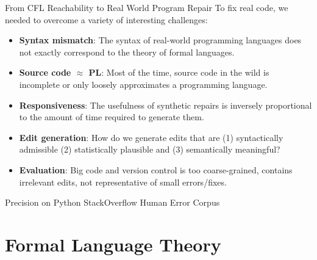 \documentclass{beamer}
\begin{document}
\begin{frame}[fragile]{From CFL Reachability to Real World Program Repair}
  To fix real code, we needed to overcome a variety of interesting challenges:\vspace{10pt}

  \begin{itemize}
    \item \textbf{Syntax mismatch}: The syntax of real-world programming languages does not exactly correspond to the theory of formal languages.
    \item \textbf{Source code $\approx$ PL}: Most of the time, source code in the wild is incomplete or only loosely approximates a programming language.
    \item \textbf{Responsiveness}: The usefulness of synthetic repairs is inversely proportional to the amount of time required to generate them.
    \item \textbf{Edit generation}: How do we generate edits that are (1) syntactically admissible (2) statistically plausible and (3) semantically meaningful?
    \item \textbf{Evaluation}: Big code and version control is too coarse-grained, contains irrelevant edits, not representative of small errors/fixes.
  \end{itemize}
\end{frame}

\begin{frame}[fragile]{Precision on Python StackOverflow Human Error Corpus}
  \begin{center}
    \resizebox{0.85\textwidth}{!}{}
  \end{center}
\end{frame}

\section{Formal Language Theory}\label{sec:fltheory}

\end{document}
